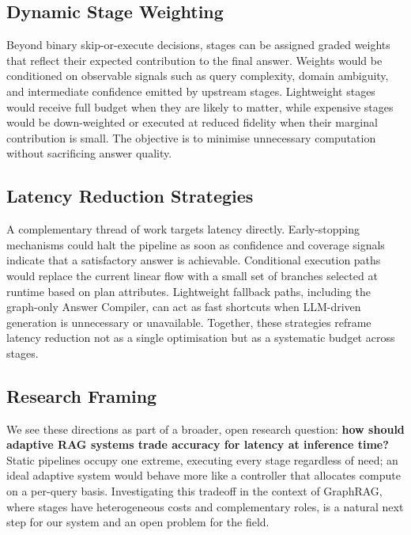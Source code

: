 \documentclass[11pt,a4paper]{article}
\begin{document}
\subsection{Dynamic Stage Weighting}

Beyond binary skip-or-execute decisions, stages can be assigned graded
weights that reflect their expected contribution to the final answer.
Weights would be conditioned on observable signals such as query complexity,
domain ambiguity, and intermediate confidence emitted by upstream stages.
Lightweight stages would receive full budget when they are likely to matter,
while expensive stages would be down-weighted or executed at reduced fidelity
when their marginal contribution is small. The objective is to minimise
unnecessary computation without sacrificing answer quality.

\subsection{Latency Reduction Strategies}

A complementary thread of work targets latency directly. Early-stopping
mechanisms could halt the pipeline as soon as confidence and coverage
signals indicate that a satisfactory answer is achievable. Conditional
execution paths would replace the current linear flow with a small set of
branches selected at runtime based on plan attributes. Lightweight fallback
paths, including the graph-only Answer Compiler, can act as fast shortcuts
when LLM-driven generation is unnecessary or unavailable. Together, these
strategies reframe latency reduction not as a single optimisation but as a
systematic budget across stages.

\subsection{Research Framing}

We see these directions as part of a broader, open research question:
\textbf{how should adaptive RAG systems trade accuracy for latency at
inference time?} Static pipelines occupy one extreme, executing every stage
regardless of need; an ideal adaptive system would behave more like a
controller that allocates compute on a per-query basis. Investigating this
tradeoff in the context of GraphRAG, where stages have heterogeneous costs
and complementary roles, is a natural next step for our system and an open
problem for the field.

\end{document}
